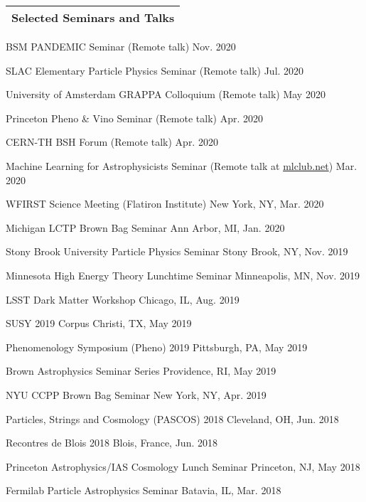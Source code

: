 \documentclass[11pt]{article}
\newenvironment{packed_itemize}{
\begin{itemize}
  \setlength{\itemsep}{3pt}
  \setlength{\parskip}{0pt}
  \setlength{\parsep}{0pt}}{\end{itemize}
}
\begin{document}
\noindent
\begin{tabular*}{\textwidth}{l@{\extracolsep{\fill}}}
\large {\sc \Large{Selected Seminars and Talks}}\\
\hline
\end{tabular*}\vspace{1.5mm}
\begin{packed_itemize}
\item BSM PANDEMIC Seminar (Remote talk) \hfill Nov. 2020
\item SLAC Elementary Particle Physics Seminar (Remote talk) \hfill Jul. 2020
\item University of Amsterdam GRAPPA Colloquium (Remote talk) \hfill May 2020
\item Princeton Pheno \& Vino Seminar (Remote talk) \hfill Apr. 2020
\item CERN-TH BSH Forum (Remote talk) \hfill  Apr. 2020
\item Machine Learning for Astrophysicists Seminar (Remote talk at \href{https://docs.google.com/document/d/1GGtE-YIuAWlmpKSr38_kyiF-Fklszhkh4FkiYWzBAho/pub}{mlclub.net}) \hfill Mar. 2020
\item WFIRST Science Meeting (Flatiron Institute) \hfill New York, NY, Mar. 2020
\item Michigan LCTP Brown Bag Seminar \hfill Ann Arbor, MI, Jan. 2020
\item Stony Brook University Particle Physics Seminar \hfill Stony Brook, NY, Nov. 2019
\item Minnesota High Energy Theory Lunchtime Seminar \hfill  Minneapolis, MN, Nov. 2019
\item LSST Dark Matter Workshop \hfill Chicago, IL, Aug. 2019
\item SUSY 2019 \hfill Corpus Christi, TX, May 2019
\item Phenomenology Symposium (Pheno) 2019 \hfill Pittsburgh, PA, May 2019
\item Brown Astrophysics Seminar Series \hfill Providence, RI, May 2019
\item NYU CCPP Brown Bag Seminar \hfill New York, NY, Apr. 2019
\item Particles, Strings and Cosmology (PASCOS) 2018 \hfill Cleveland, OH, Jun. 2018
\item Recontres de Blois 2018 \hfill Blois, France, Jun. 2018
\item Princeton Astrophysics/IAS Cosmology Lunch Seminar \hfill Princeton, NJ, May 2018
\item Fermilab Particle Astrophysics Seminar \hfill Batavia, IL, Mar. 2018

\end{packed_itemize}
\end{document}
